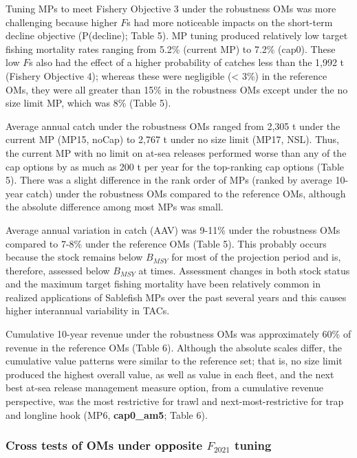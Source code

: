 \documentclass[11pt]{book}
\begin{document}
Tuning MPs to meet Fishery Objective 3 under the robustness OMs was more challenging because higher \(F\)s had more noticeable impacts on the short-term decline objective (P(decline); Table 5). MP tuning produced relatively low target fishing mortality rates ranging from 5.2\% (current MP) to 7.2\% (cap0). These low \(F\)s also had the effect of a higher probability of catches less than the 1,992 t (Fishery Objective 4); whereas these were negligible (\textless{} 3\%) in the reference OMs, they were all greater than 15\% in the robustness OMs except under the no size limit MP, which was 8\% (Table 5).

Average annual catch under the robustness OMs ranged from 2,305 t under the current MP (MP15, noCap) to 2,767 t under no size limit (MP17, NSL). Thus, the current MP with no limit on at-sea releases performed worse than any of the cap options by as much as 200 t per year for the top-ranking cap options (Table 5). There was a slight difference in the rank order of MPs (ranked by average 10-year catch) under the robustness OMs compared to the reference OMs, although the absolute difference among most MPs was small.

Average annual variation in catch (AAV) was 9-11\% under the robustness OMs compared to 7-8\% under the reference OMs (Table 5). This probably occurs because the stock remains below \(B_{MSY}\) for most of the projection period and is, therefore, assessed below \(B_{MSY}\) at times. Assessment changes in both stock status and the maximum target fishing mortality have been relatively common in realized applications of Sablefish MPs over the past several years and this causes higher interannual variability in TACs.

Cumulative 10-year revenue under the robustness OMs was approximately 60\% of revenue in the reference OMs (Table 6). Although the absolute scales differ, the cumulative value patterns were similar to the reference set; that is, no size limit produced the highest overall value, as well as value in each fleet, and the next best at-sea release management measure option, from a cumulative revenue perspective, was the most restrictive for trawl and next-most-restrictive for trap and longline hook (MP6, \textbf{cap0\_am5}; Table 6).

\hypertarget{cross-tests-of-oms-under-opposite-f_2021-tuning}{%
\subsubsection{\texorpdfstring{Cross tests of OMs under opposite \(F_{2021}\) tuning}{Cross tests of OMs under opposite F\_\{2021\} tuning}}\label{cross-tests-of-oms-under-opposite-f_2021-tuning}}
\end{document}
